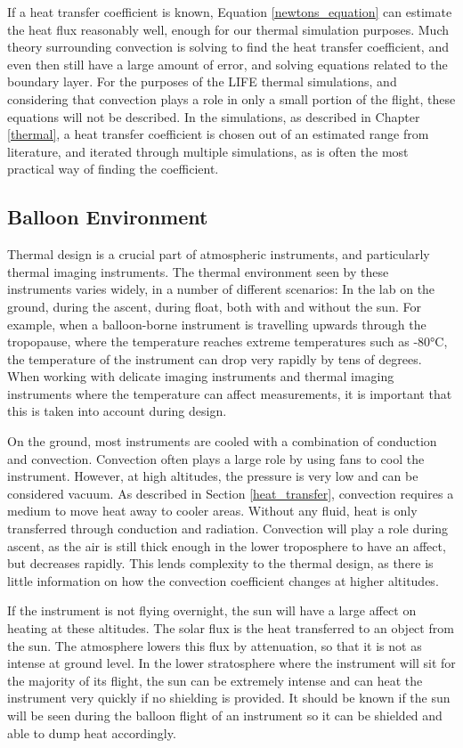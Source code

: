 If a heat transfer coefficient is known, Equation \ref{newtons_equation} can estimate the heat flux reasonably well, enough for our thermal simulation purposes. Much theory surrounding convection is solving to find the heat transfer coefficient, and even then still have a large amount of error, and solving equations related to the boundary layer. For the purposes of the LIFE thermal simulations, and considering that convection plays a role in only a small portion of the flight, these equations will not be described. In the simulations, as described in Chapter \ref{thermal}, a heat transfer coefficient is chosen out of an estimated range from literature, and iterated through multiple simulations, as is often the most practical way of finding the coefficient. 

\subsection{Balloon Environment} \label{balloon_env}%
Thermal design is a crucial part of atmospheric instruments, and particularly thermal imaging instruments. The thermal environment seen by these instruments varies widely, in a number of different scenarios: In the lab on the ground, during the ascent, during float, both with and without the sun. For example, when a balloon-borne instrument is travelling upwards through the tropopause, where the temperature reaches extreme temperatures such as -80°C, the temperature of the instrument can drop very rapidly by tens of degrees. When working with delicate imaging instruments and thermal imaging instruments where the temperature can affect measurements, it is important that this is taken into account during design.

On the ground, most instruments are cooled with a combination of conduction and convection. Convection often plays a large role by using fans to cool the instrument. However, at high altitudes, the pressure is very low and can be considered vacuum. As described in Section \ref{heat_transfer}, convection requires a medium to move heat away to cooler areas. Without any fluid, heat is only transferred through conduction and radiation. Convection will play a role during ascent, as the air is still thick enough in the lower troposphere to have an affect, but decreases rapidly. This lends complexity to the thermal design, as there is little information on how the convection coefficient changes at higher altitudes. 

If the instrument is not flying overnight, the sun will have a large affect on heating at these altitudes. The solar flux is the heat transferred to an object from the sun. The atmosphere lowers this flux by attenuation, so that it is not as intense at ground level. In the lower stratosphere where the instrument will sit for the majority of its flight, the sun can be extremely intense and can heat the instrument very quickly if no shielding is provided. It should be known if the sun will be seen during the balloon flight of an instrument so it can be shielded and able to dump heat accordingly.

